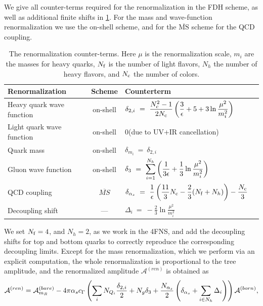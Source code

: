 We give all counter-terms required for the renormalization in the FDH scheme, as well as additional finite shifts in \cref{tab:renorm}.
For the mass and wave-function renormalization we use the on-shell scheme,
and for the $\overline{\text{MS}}$ scheme for the QCD coupling.
\begin{table}[h]
  \begin{tabular}{lcll}
    \toprule
    \textbf{Renormalization} & \textbf{Scheme} & \textbf{Counterterm} \\
    \midrule
    Heavy quark wave function   & on-shell & $\displaystyle \delta_{2,i} ~=~ \frac{N_\mathrm{c}^2-1}{2N_\mathrm{c}} \left( \frac{3}{\epsilon} + 5 + 3 \ln{\frac{\mu^2}{m_i^2}} \right)$\\
    Light quark wave function   & on-shell & 0\quad({\footnotesize due to UV+IR cancellation}) \\
    Quark mass            & on-shell & $\displaystyle \delta_{m_i} ~=~ \delta_{2,i}\quad\text{}$\\
    Gluon wave function   & on-shell & $\displaystyle \delta_3 ~=~ \sum_{i=1}^{N_h} \qty(\frac{1}{3\epsilon} + \frac{1}{3}\ln{\frac{\mu^2}{m_i^2}})$\\
    QCD coupling & $\overline{MS}$ & $\displaystyle \delta_{\alpha_s} ~=~ \frac{1}{\epsilon} \left( \frac{11}{3}N_\mathrm{c} - \frac{2}{3}(N_\mathrm{f}+N_h) \right) - \frac{N_\mathrm{c}}{3}$\\
    \midrule
    Decoupling shift & --- & $\displaystyle     \Delta_i ~=~  -\frac{2}{3}\ln{\frac{\mu^2}{m_i^2}} $\\
    \bottomrule
  \end{tabular}
  \caption{The renormalization counter-terms. Here $\mu$ is the renormalization
    scale, $m_{i}$ are the masses for heavy quarks, $N_\mathrm{f}$ is the number of light flavors,
    $N_h$ the number of heavy flavors, and $N_\mathrm{c}$ the number of colors.
  }
  \label{tab:renorm}
\end{table}
We set $N_\mathrm{f}=4$, and $N_h=2$, as we work in the 4FNS, and 
add the decoupling shifts for top and bottom quarks to correctly reproduce the corresponding decoupling limits.
Except for the mass renormalization, which we perform via an explicit computation,
the whole renormalization is proportional to the tree amplitude, 
and the renormalized amplitude $\mathcal{A}^{(ren)}$ is
obtained as
\begin{equation}
  \mathcal{A}^{(ren)} =
  \mathcal{A}^{(bare)}_{m_R} - 4\pi \alpha_s c_\Gamma 
  \left( \sum_i N_{Q_i} \frac{\delta_{2,i}}{2} + N_{g}\delta_3 + \frac{N_{\alpha_s}}{2}\left(\delta_{\alpha_s} + \sum_{i\in N_h}\Delta_i\right) \right)  \mathcal{A}^{(born)},
  \label{renfull}
\end{equation}
